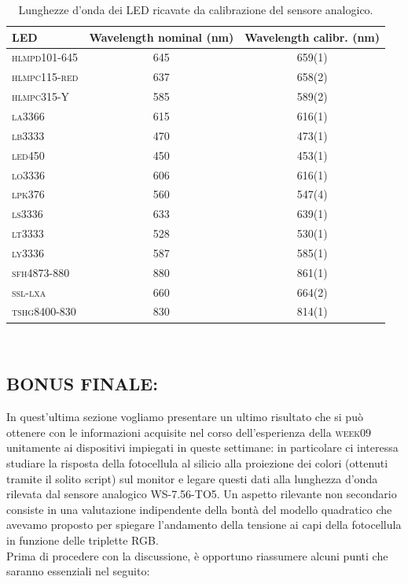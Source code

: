 \documentclass[10pt,letterpaper]{article}
\begin{document}
\begin{table}[h]
\centering
\begin{tabular}{l|c|c}
\hline
\textbf{LED} & \textbf{Wavelength} nominal (nm) & \textbf{Wavelength} calibr. (nm) \\
\hline
\textsc{hlmpd101-645} & 645 & 659(1) \\
\textsc{hlmpc115-red} & 637 & 658(2)  \\
\textsc{hlmpc315-Y} & 585 & 589(2)  \\
\textsc{la3366} & 615 & 616(1) \\
\textsc{lb3333} & 470 & 473(1) \\
\textsc{led450} & 450 & 453(1) \\
\textsc{lo3336} & 606 & 616(1) \\
\textsc{lpk376} & 560 & 547(4) \\
\textsc{ls3336} & 633 & 639(1) \\
\textsc{lt3333} & 528 & 530(1) \\
\textsc{ly3336} & 587 & 585(1) \\
\textsc{sfh4873-880} & 880 & 861(1) \\
\textsc{ssl-lxa} & 660 & 664(2) \\
\textsc{tshg8400-830} & 830 & 814(1) \\
\hline
\end{tabular}
\caption{Lunghezze d'onda dei LED ricavate da calibrazione del sensore analogico.}
\label{tabella_LED_ext}
\end{table}
~\\


\subsection{BONUS FINALE: }
In quest'ultima sezione vogliamo presentare un ultimo risultato che si può ottenere con le informazioni acquisite nel corso dell'esperienza della \textsc{week09} unitamente ai dispositivi impiegati in queste settimane: in particolare ci interessa studiare la risposta della fotocellula al silicio alla proiezione dei colori (ottenuti tramite il solito script) sul monitor e legare questi dati alla lunghezza d'onda rilevata dal sensore analogico \textsc{WS-7.56-TO5}. Un aspetto rilevante non secondario consiste in una valutazione indipendente della bontà del modello quadratico che avevamo proposto per spiegare l'andamento della tensione ai capi della fotocellula in funzione delle triplette RGB.\\
Prima di procedere con la discussione, è opportuno riassumere alcuni punti che saranno essenziali nel seguito:
\end{document}
